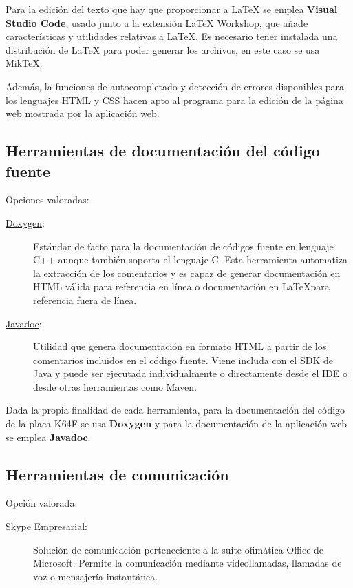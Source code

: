 Para la edición del texto que hay que proporcionar a \LaTeX{} se emplea
\textbf{Visual Studio Code}, usado junto a la extensión \href{https://marketplace.visualstudio.com/items?itemName=James-Yu.latex-workshop}
{LaTeX Workshop}, que añade características y utilidades relativas a \LaTeX.
Es necesario tener instalada una distribución de \LaTeX{} para poder generar los
archivos, en este caso se usa \href{https://miktex.org/}{MikTeX}.

Además, la funciones de autocompletado y detección de errores disponibles para
los lenguajes HTML y CSS hacen apto al programa para la edición de la página
web mostrada por la aplicación web.

\subsection{Herramientas de documentación del código fuente}
{\label{sec:source-docs}}
Opciones valoradas:
\begin{description}
  \item[\href{http://www.doxygen.nl/}{Doxygen}:] Estándar de facto para la
  documentación de códigos fuente en lenguaje C++ aunque también soporta el
  lenguaje C. Esta herramienta automatiza la extracción de los comentarios y
  es capaz de generar documentación en HTML válida para referencia en línea o
  documentación en \LaTeX para referencia fuera de línea.
  \item[\href{https://www.oracle.com/technetwork/java/javase/documentation/javadoc-137458.html}
  {Javadoc}:] Utilidad que genera documentación en formato HTML a partir de los
  comentarios incluidos en el código fuente. Viene includa con el SDK de Java 
  y puede ser ejecutada individualmente o directamente desde el IDE o desde
  otras herramientas como Maven.
\end{description}

Dada la propia finalidad de cada herramienta, para la documentación del código
de la placa K64F se usa \textbf{Doxygen} y para la documentación de la
aplicación web se emplea \textbf{Javadoc}.

\subsection{Herramientas de comunicación}{\label{sec:comms}}
Opción valorada:
\begin{description}
  \item[\href{https://www.skype.com/es/business/}{Skype Empresarial}:] Solución
  de comunicación perteneciente a la suite ofimática Office de Microsoft.
  Permite la comunicación mediante videollamadas, llamadas de voz o mensajería
  instantánea.
\end{description}

